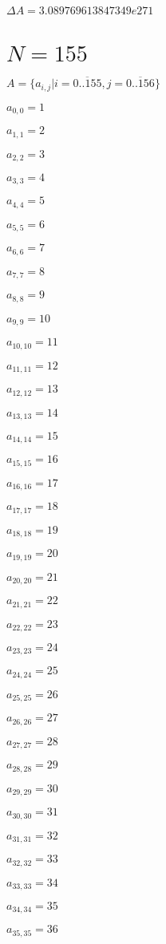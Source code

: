 \documentclass[a4paper,12pt]{article}
\begin{document}
$\Delta A = 3.089769613847349e271$



\section{ $N = 155$ }
$A = \{ a _{ i, j } | i = \overline { 0..155 }, j = \overline { 0..156 } \}$

$a _{ 0, 0 } = 1$

$a _{ 1, 1 } = 2$

$a _{ 2, 2 } = 3$

$a _{ 3, 3 } = 4$

$a _{ 4, 4 } = 5$

$a _{ 5, 5 } = 6$

$a _{ 6, 6 } = 7$

$a _{ 7, 7 } = 8$

$a _{ 8, 8 } = 9$

$a _{ 9, 9 } = 10$

$a _{ 10, 10 } = 11$

$a _{ 11, 11 } = 12$

$a _{ 12, 12 } = 13$

$a _{ 13, 13 } = 14$

$a _{ 14, 14 } = 15$

$a _{ 15, 15 } = 16$

$a _{ 16, 16 } = 17$

$a _{ 17, 17 } = 18$

$a _{ 18, 18 } = 19$

$a _{ 19, 19 } = 20$

$a _{ 20, 20 } = 21$

$a _{ 21, 21 } = 22$

$a _{ 22, 22 } = 23$

$a _{ 23, 23 } = 24$

$a _{ 24, 24 } = 25$

$a _{ 25, 25 } = 26$

$a _{ 26, 26 } = 27$

$a _{ 27, 27 } = 28$

$a _{ 28, 28 } = 29$

$a _{ 29, 29 } = 30$

$a _{ 30, 30 } = 31$

$a _{ 31, 31 } = 32$

$a _{ 32, 32 } = 33$

$a _{ 33, 33 } = 34$

$a _{ 34, 34 } = 35$

$a _{ 35, 35 } = 36$
\end{document}

